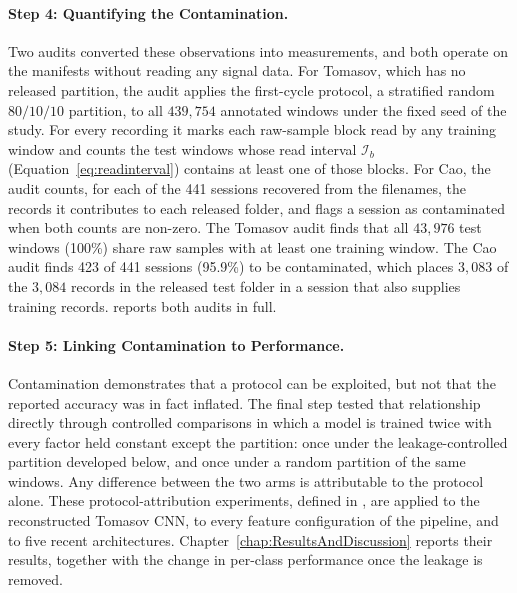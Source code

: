 \paragraph[Step 4: Quantifying the Contamination]{Step 4: Quantifying the Contamination.}
Two audits converted these observations into measurements, and both operate on the manifests without reading any signal data. For Tomasov, which has no released partition, the audit applies the first-cycle protocol, a stratified random $80/10/10$ partition, to all $439{,}754$ annotated windows under the fixed seed of the study. For every recording it marks each raw-sample block read by any training window and counts the test windows whose read interval $\mathcal{I}_b$ (Equation~\eqref{eq:readinterval}) contains at least one of those blocks. For Cao, the audit counts, for each of the 441 sessions recovered from the filenames, the records it contributes to each released folder, and flags a session as contaminated when both counts are non-zero. The Tomasov audit finds that all $43{,}976$ test windows (100\%) share raw samples with at least one training window. The Cao audit finds 423 of 441 sessions (95.9\%) to be contaminated, which places $3{,}083$ of the $3{,}084$ records in the released test folder in a session that also supplies training records.  reports both audits in full.

\paragraph[Step 5: Linking Contamination to Performance]{Step 5: Linking Contamination to Performance.}
Contamination demonstrates that a protocol can be exploited, but not that the reported accuracy was in fact inflated. The final step tested that relationship directly through controlled comparisons in which a model is trained twice with every factor held constant except the partition: once under the leakage-controlled partition developed below, and once under a random partition of the same windows. Any difference between the two arms is attributable to the protocol alone. These protocol-attribution experiments, defined in , are applied to the reconstructed Tomasov CNN, to every feature configuration of the pipeline, and to five recent architectures. Chapter~\ref{chap:ResultsAndDiscussion} reports their results, together with the change in per-class performance once the leakage is removed.

